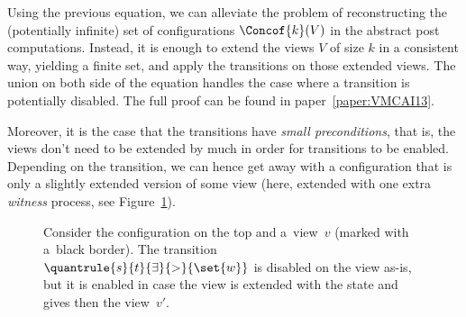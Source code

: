 Using the previous equation, we can alleviate the problem of
reconstructing the (potentially infinite) set of configurations
$\Concof{k}(V)$ in the abstract post computations.
%
Instead, it is enough to extend the views $V$ of size $k$ in a
consistent way, yielding a finite set, and apply the transitions on
those extended views.
%
The union on both side of the equation handles the case where a
transition is potentially disabled.
%
The full proof can be found in paper~\ref{paper:VMCAI13}.



%
%
Moreover, it is the case that the transitions have \emph{small
  preconditions}, that is, the views don't need to be extended by much
in order for transitions to be enabled.
%
Depending on the transition, we can hence get away with a
configuration that is only a slightly extended version of some view
(here, extended with one extra \emph{witness} process, see
Figure~\ref{figure:view:small:preconditions}).

\begingroup%
\setlength\intextsep{\dazintextsep}
\begin{figure}[ht]
  \centering
  \caption{Consider the configuration on the top and a~view~$v$
    (marked with a~black border). The transition
    {\protect$\quantrule{s}{t}{\exists}{>}{\set{w}}$} is disabled on
    the view as-is, but it is enabled in case the view is extended
    with the state  and gives then the view~$v'$.}
  \label{figure:view:small:preconditions}
\end{figure}
\endgroup

